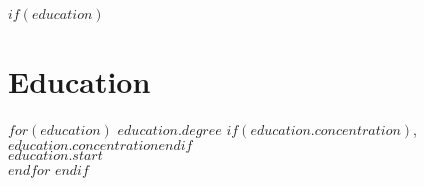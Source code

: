 $if(education)$
\section*{Education}
\noindent
$for(education)$
  \textbf{$education.degree$}
  $if(education.concentration)$,$education.concentration$$endif$\\
  \emph{$education.start$} \\[.2cm]
$endfor$
$endif$
